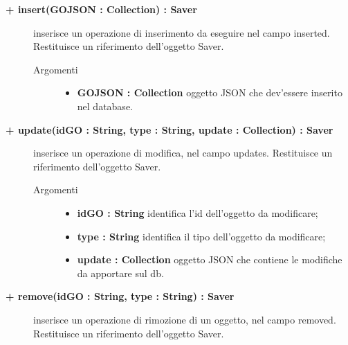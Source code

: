 \begin{description}
	\begin{description}
		\item[\textbf{\color{blue}+ insert(GOJSON : Collection) : Saver			}] \hfill
			inserisce un operazione di inserimento da eseguire nel campo inserted. Restituisce un riferimento dell'oggetto Saver.
			
		\begin{description}
			\item[Argomenti] \hfill
				\begin{itemize}
				
					\item \textbf{GOJSON : Collection			} \hfill
					oggetto JSON che dev'essere inserito nel database.
				\end{itemize}
		\end{description}
	\end{description}	

	\begin{description}
		\item[\textbf{\color{blue}+ update(idGO : String, type : String, update : Collection) : Saver			}] \hfill
			inserisce un operazione di modifica, nel campo updates. Restituisce un riferimento dell'oggetto Saver.
			
		\begin{description}
			\item[Argomenti] \hfill
				\begin{itemize}
				
					\item \textbf{idGO : String			} \hfill
					identifica l'id dell'oggetto da modificare;
					\item \textbf{type : String			} \hfill
					identifica il tipo dell'oggetto da modificare;
					\item \textbf{update : Collection			} \hfill
					oggetto JSON che contiene le modifiche da apportare sul db. 
				\end{itemize}
		\end{description}
	\end{description}

	\begin{description}
		\item[\textbf{\color{blue}+ remove(idGO : String, type : String) : Saver			}] \hfill
			inserisce un operazione di rimozione di un oggetto, nel campo removed. Restituisce un riferimento dell'oggetto Saver.
			

\end{description}
\end{description}
